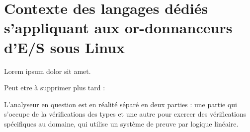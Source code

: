 \section[Contexte des langages dédiés s'appliquant aux ordonnanceurs d'E/S sous Linux]{Contexte des langages dédiés s'appliquant aux or-donnanceurs d'E/S sous Linux}
\label{context}

Lorem ipsum dolor sit amet.


Peut etre à supprimer plus tard :

L'analyseur en question est en réalité séparé en deux parties : une partie qui s'occupe de la 
vérifications des types et une autre pour exercer des vérifications spécifiques au domaine, qui
utilise un système de preuve par logique linéaire.
